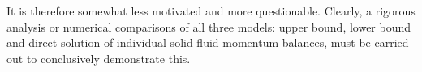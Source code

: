  It is therefore somewhat less motivated and more
questionable. Clearly, a rigorous analysis or numerical comparisons of
all three models: upper bound, lower bound and direct solution of
individual solid-fluid momentum balances, must be carried out to
conclusively demonstrate this.



%


